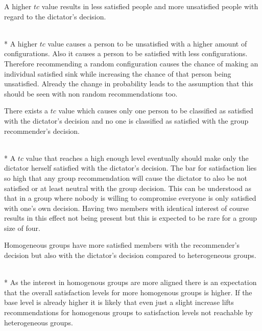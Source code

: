 \begin{hypothesis}
    \begin{itshape}
        \label{hyp:Evaluation:HigherTcLessSatisfied} A higher $tc$ value results in less satisfied people and more unsatisfied people with regard to the dictator's decision.
    \end{itshape} \medskip \\*
    A higher $tc$ value causes a person to be unsatisfied with a higher amount of configurations. Also it causes a person to be satisfied with less configurations. Therefore recommending a random configuration causes the chance of making an individual satisfied sink while increasing the chance of that person being unsatisfied. Already the change in probability leads to the assumption that this should be seen with non random recommendations too.
\end{hypothesis}

\begin{hypothesis}
    \begin{itshape}
        \label{hyp:Evaluation:OnlyOneSatisfied} There exists a $tc$ value which causes only one person to be classified as satisfied with the dictator's decision and no one is classified as satisfied with the group recommender's decision.
    \end{itshape} \medskip \\*
    A $tc$ value that reaches a high enough level eventually should make only the dictator herself satisfied with the dictator's decision. The bar for satisfaction lies so high that any group recommendation will cause the dictator to also be not satisfied or at least neutral with the group decision. This can be understood as that in a group where nobody is willing to compromise everyone is only satisfied with one's own decision. Having two members with identical interest of course results in this effect not being present but this is expected to be rare for a group size of four. 
\end{hypothesis}

\begin{hypothesis}
    \begin{itshape}
        \label{hyp:Evaluation:HomogenousMoreSatisfied} Homogeneous groups have more satisfied members with the recommender's decision but also with the dictator's decision compared to heterogeneous groups.
    \end{itshape} \medskip \\*
    As the interest in homogenous groups are more aligned there is an expectation that the overall satisfaction levels for more homogenous groups is higher. If the base level is already higher it is likely that even just a slight increase lifts recommendations for homogenous groups to satisfaction levels not reachable by heterogeneous groups.
\end{hypothesis}

